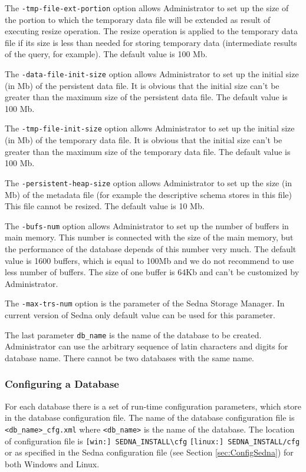 \documentclass[a4paper,12pt]{article}
\begin{document}
The \verb!-tmp-file-ext-portion! option allows Administrator to set up the size of the portion to which the temporary data file will be extended as result of executing resize operation. The resize operation is applied to the temporary data file if its size is less than needed for storing temporary data (intermediate results of the query, for example). The default value is 100 Mb.

The \verb!-data-file-init-size! option allows Administrator to set up the initial size (in Mb) of the persistent data file. It is obvious that the initial size can't be greater than the maximum size of the persistent data file. The default value is 100 Mb.

The \verb!-tmp-file-init-size! option allows Administrator to set up the initial size (in Mb) of the temporary data file. It is obvious that the initial size can't be greater than the maximum size of the temporary data file. The default value is 100 Mb.

The \verb!-persistent-heap-size! option allows Administrator to set up the size (in Mb) of the metadata file (for example the descriptive schema stores in this file) This file cannot be resized. The default value is 10 Mb.

The \verb!-bufs-num! option allows Administrator to set up the number of buffers in main memory. This number is connected with the size of the main memory, but the performance of the database depends of this number very much. The default value is 1600 buffers, which is equal to 100Mb and we do not recommend to use less number of buffers. The size of one buffer is 64Kb and can't be customized by Administrator.

The \verb!-max-trs-num! option is the parameter of the Sedna Storage Manager. In current version of Sedna only default value can be used for this parameter.

The last parameter \verb!db_name! is the name of the database to be created. Administrator can use the arbitrary sequence of latin characters and digits for database name. There  cannot be two databases with the same name.

\subsubsection{Configuring a Database}
\label{ConfigDB}
For each database there is a set of run-time configuration parameters, which store in the database configuration file. The name of the database configuration file is \verb!<db_name>_cfg.xml! where \verb!<db_name>! is the name of the database. The location of configuration file is \verb![win:] SEDNA_INSTALL\cfg! \verb![linux:] SEDNA_INSTALL/cfg! or as specified in the Sedna configuration file (see Section \ref{sec:ConfigSedna}) for both Windows and Linux. 
\end{document}
